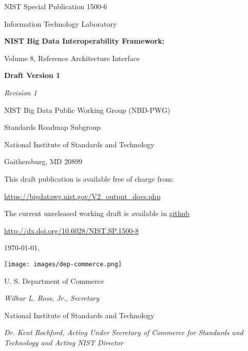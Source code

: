 

\begin{flushright}
NIST Special Publication 1500-6

Information Technology Laboratory

\bigskip 

{\Huge\bf\sf NIST Big Data Interoperability Framework:

\bigskip

Volume 8, Reference Architecture Interface
}

\bigskip

{\bf Draft Version 1}

{\it Revision 1}

\bigskip \bigskip \bigskip \bigskip \bigskip \bigskip


NIST Big Data Public Working Group (NBD-PWG)

Standards Roadmap Subgroup

National Institute of Standards and Technology

Gaithersburg, MD 20899

\bigskip
\bigskip

This draft publication is available free of charge from:

\url{https://bigdatawg.nist.gov/V2_output_docs.php}
 
The current unreleased working draft is available in \href{https://raw.githubusercontent.com/cloudmesh/cloudmesh.rest/master/docs/NIST.SP.1500-8-draft.pdf}{github}


\bigskip

\url{http://dx.doi.org/10.6028/NIST.SP.1500-8}

\bigskip

\today, \currenttime

\vfill

\begin{flushright}
\texttt{[image: images/dep-commerce.png]}
\end{flushright}

 
U. S. Department of Commerce

{\it Wilbur L. Ross, Jr., Secretary}

\bigskip
National Institute of Standards and Technology

{\it Dr. Kent Rochford, Acting Under Secretary of Commerce for Standards and Technology and Acting NIST Director}

\end{flushright}
\newpage


